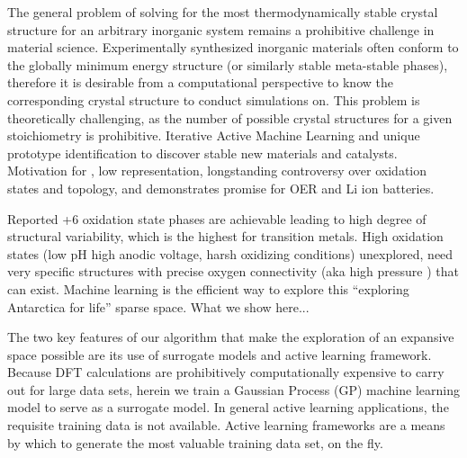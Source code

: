 

The general problem of solving for the most thermodynamically stable crystal structure for an arbitrary inorganic system remains a prohibitive challenge in material science.
Experimentally synthesized inorganic materials often conform to the globally minimum energy structure (or similarly stable meta-stable phases),
therefore it is desirable from a computational perspective to know the corresponding crystal structure to conduct simulations on.
This problem is theoretically challenging, as the number of possible crystal structures for a given stoichiometry is prohibitive.
Iterative Active Machine Learning and unique prototype identification to discover stable new materials and catalysts.
Motivation for , low representation, longstanding controversy over oxidation states and topology, and demonstrates promise for OER and Li ion batteries.

Reported +6 oxidation state phases are achievable leading to high degree of structural variability, which is the highest for transition metals.
High oxidation states (low pH high anodic voltage, harsh oxidizing conditions) unexplored, need very specific structures with precise oxygen connectivity (aka high pressure ) that can exist.
Machine learning is the efficient way to explore this “exploring Antarctica for life” sparse space.
What we show here...

The two key features of our algorithm that make the exploration of an expansive space possible are its use of surrogate models and active learning framework.
Because DFT calculations are prohibitively computationally expensive to carry out for large data sets, herein we train a Gaussian Process (GP) machine learning model to serve as a surrogate model.
In general active learning applications, the requisite training data is not available.
Active learning frameworks are a means by which to generate the most valuable training data set, on the fly.


